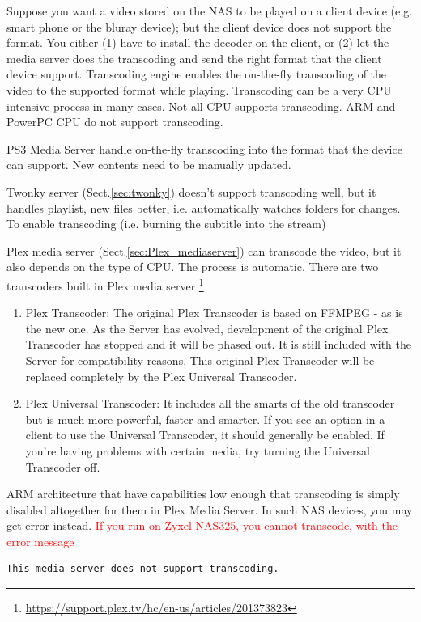 Suppose you want a video stored on the NAS to be played on a client device (e.g.
smart phone or the bluray device); but the client device does not support the
format.
You either (1) have to install the decoder on the client, or (2) let the media
server does the transcoding and send the right format that the client device
support. Transcoding engine enables the on-the-fly transcoding of the video to
the supported format while playing. Transcoding can be a very CPU intensive
process in many cases.
Not all CPU supports transcoding. ARM and PowerPC CPU do not support
transcoding. 

PS3 Media Server handle on-the-fly transcoding into the format that the device
can support. New contents need to be manually updated.

Twonky server (Sect.\ref{sec:twonky}) doesn't support transcoding well, but it
handles playlist, new files better, i.e. automatically watches folders for
changes. To enable transcoding (i.e. burning the subtitle into the stream)

Plex media server (Sect.\ref{sec:Plex_mediaserver}) can transcode the video,
but it also depends on the type of CPU. The process is automatic.
There are two transcoders built in Plex media server
\footnote{\url{https://support.plex.tv/hc/en-us/articles/201373823}}

\begin{enumerate}
  
  \item Plex Transcoder: The original Plex Transcoder is based on FFMPEG - as is
  the new one. As the Server has evolved, development of the original Plex
  Transcoder has stopped and it will be phased out. It is still included with
  the Server for compatibility reasons. This original Plex Transcoder will be
  replaced completely by the Plex Universal Transcoder.     
  
  \item Plex Universal Transcoder: It includes all the smarts of the
old transcoder but is much more powerful, faster and smarter. If you see an
option in a client to use the Universal Transcoder, it should generally be
enabled. If you're having problems with certain media, try turning the Universal
Transcoder off.   
\end{enumerate}
ARM architecture that have capabilities low enough that transcoding is simply
disabled altogether for them in Plex Media Server. In such NAS devices, you may
get error instead. \textcolor{red}{If you run on Zyxel NAS325, you cannot
transcode, with the error message}
\begin{verbatim}
This media server does not support transcoding.
\end{verbatim}

